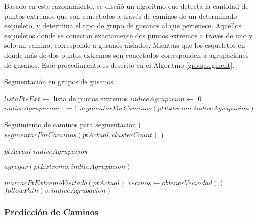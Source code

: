 Basado en este razonamiento, se dise\~n\'o un algoritmo que detecta la cantidad de
puntos extremos que son conectados a trav\'es de caminos de un determinado esqueleto,
y determina el tipo de grupo de gusanos al que pertenece. Aquellos esqueletos donde
se conectan exactamente dos puntos extremos a trav\'es de uno y solo un camino, corresponde
a gusanos aislados. Mientras que los esqueletos en donde m\'as de dos puntos extremos son
conectados corresponden a agrupaciones de gusanos.
Este procedimiento es descrito en el Algoritmo \ref{groupsegment}. 

\begin{algorithm}[h]                     
\caption{Segmentaci\'on en grupos de gusanos}         
\label{groupsegment}                    
\begin{algorithmic}                   

\STATE $listaPtsExt \leftarrow$ lista de puntos extremos
\STATE $indiceAgrupacion \leftarrow$ 0
\STATE {}
\ELSE
\STATE $indiceAgrupacion +=1$
\STATE $segmentarPorCaminos(ptExtremo,indiceAgrupacion)$
\ENDIF
\ENDFOR
\end{algorithmic}
\end{algorithm}

\begin{algorithm}[h]                     
\caption{Seguimiento de caminos para segmentaci\'on ($segmentarPorCaminos(ptActual,clusterCount)$ )}         
\begin{algorithmic}                   

\REQUIRE $ptActual$
\REQUIRE $indiceAgrupacion$

\RETURN 
\ELSE
\STATE $agregar(ptExtremo,indiceAgrupacion)$
\ENDIF

\STATE {}
\STATE $marcarPtExtremoVisitado(ptActual)$
\ENDIF
\STATE $vecinos \leftarrow obtenerVecindad()$
\STATE $followPath(v,indiceAgrupacion)$
\ENDFOR

\end{algorithmic}
\end{algorithm}


\subsubsection*{Predicci\'on de Caminos}
\label{sec:pathguessing}

